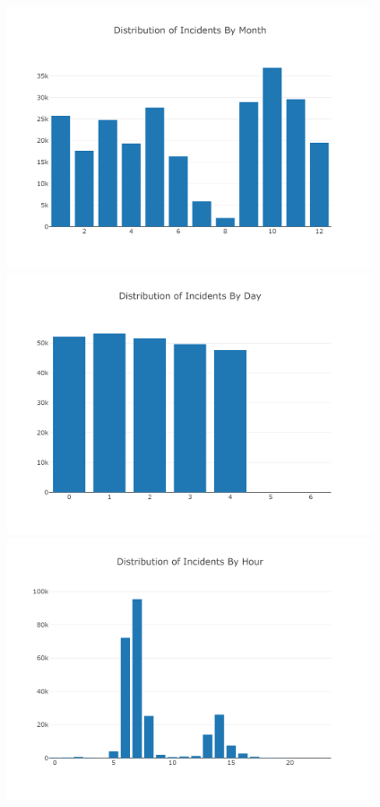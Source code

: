 \documentclass[11pt]{article}
\begin{document}
\begin{center}
\includegraphics[width=4.25in]{images/month.png}
\includegraphics[width=4.25in]{images/weekday.png}
\includegraphics[width=4.25in]{images/hour.png}
\end{center}
\end{document}
